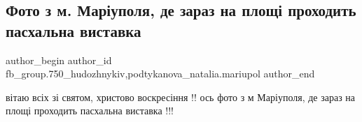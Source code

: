  
 
 
 
 

\subsection{Фото з м. Маріуполя, де зараз на площі проходить пасхальна виставка}
\label{sec:28_04_2019.fb.fb_group.750_hudozhnykiv.1.foto_z_mariupolja_pysanky}
 
\ifcmt
 author_begin
   author_id fb_group.750_hudozhnykiv,podtykanova_natalia.mariupol
 author_end
\fi

вітаю всіх зі святом, христово воскресіння !!  ось фото з м Маріуполя, де зараз
на площі проходить пасхальна виставка !!!

